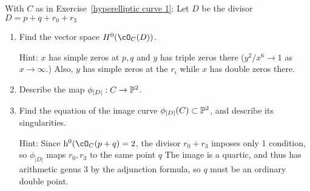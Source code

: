 \begin{exercise}
With $C$ as in Exercise~\ref{hyperelliptic curve 1}:
Let $D$ be the divisor $D = p + q + r_0 + r_3$
\begin{enumerate}
\item Find the vector space $H^0(\cO_C(D))$. 

Hint: $x$ has simple zeros at $p,q$ and $y$ has triple zeros there ($y^2/x^6 \to 1$ as $x\to \infty$.)
Also, $y$ has simple zeros at the $r_i$ while $x$ has double zeros there. %
\item Describe the map $\phi_{|D|} : C \to \PP^2$. 
\item Find the equation of the image curve $\phi_{|D|}(C) \subset \PP^2$, and describe its singularities.

Hint: 
Since $\h^0(\cO_C(p+q) = 2$, the divisor $r_0+r_3$ imposes only 1 condition, so $\phi_{|D|}$ maps $r_0,r_3$ to the same
point $q$
The image is a quartic, and thus has arithmetic genus 3 by the adjunction formula, so $q$ must be
an ordinary double point.
\end{enumerate}
\end{exercise}


